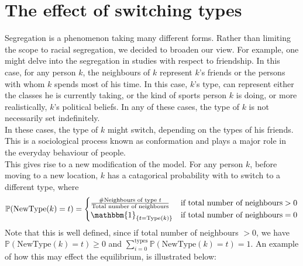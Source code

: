 \section{The effect of switching types}
\label{section:switch}
Segregation is a phenomenon taking many different forms. Rather than  limiting the scope to racial segregation, we decided to broaden our view. 
For example, one might delve into the segregation in studies with respect to friendship. 
In this case, for any person \(k\), the neighbours of \(k\) represent \(k\)'s friends or the persons with whom \(k\) spends most of his time.
In this case, \(k\)'s type, can represent either the classes he is currently taking, or the kind of sports person \(k\) is doing, or more realistically, \(k\)'s political beliefs.
In any of these cases, the type of \(k\) is not necessarily set indefinitely.\\
In these cases, the type of \(k\) might switch, depending on the types of his friends. This is a sociological process known as conformation and plays a major role in the everyday behaviour of people.\\


This gives rise to a new modification of the model.
For any person \(k\), before moving to a new location, \(k\) has a catagorical probability with to switch to a different type, where 
\[\mathbb{P}(\text{NewType}(k)=t) = \begin{cases} 
 \frac{\#\text{Neighbours of type }t}{\text{Total number of neighbours}}	&\mbox{if } \text{total number of neighbours}>0 \\ 
\mathbbm{1}_{\{t=\text{Type}(k)\}}   &\mbox{if } \text{total number of neighbours}=0
\end{cases}\]
Note that this is well defined, since if total number of neighbours \(> 0\), we have \( \mathbb{P}(\text{NewType}(k)=t) \geq 0\) and \(\sum_{i=0}^{\text{types}}\mathbb{P}(\text{NewType}(k)=t)=1\). An example of how this may effect the equilibrium, is illustrated below:

